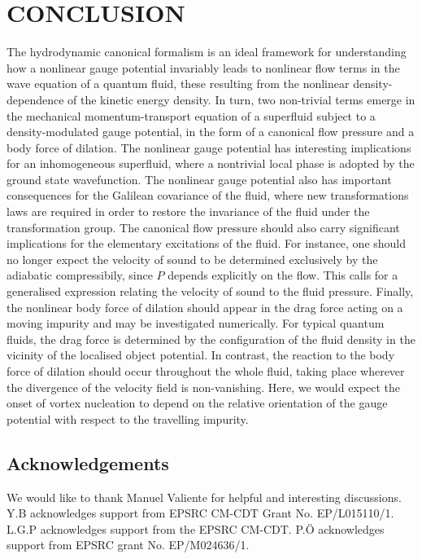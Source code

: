 \documentclass[twocolumn, nofootinbib, nobibnotes, amsmath,amssymb,aps, pra, floatfix]{revtex4-1}
\begin{document}
\section{\label{sec:conclusion}CONCLUSION}
The hydrodynamic canonical formalism is an ideal framework for understanding how a nonlinear gauge potential invariably leads to nonlinear flow terms in the wave equation of a quantum fluid, these resulting from the nonlinear density-dependence of the kinetic energy density.
In turn, two non-trivial terms emerge in the mechanical momentum-transport equation of a superfluid subject to a density-modulated gauge potential, in the form of a canonical flow pressure and a body force of dilation.
The nonlinear gauge potential has interesting implications for an inhomogeneous superfluid, where a nontrivial local phase is adopted by the ground state wavefunction.
The nonlinear gauge potential also has important consequences for the Galilean covariance of the fluid, where new transformations laws are required in order to restore the invariance of the fluid under the transformation group.
The canonical flow pressure should also carry significant implications for the elementary excitations of the fluid.
For instance, one should no longer expect the velocity of sound to be determined exclusively by the adiabatic compressibily, since $P$ depends explicitly on the flow.
This calls for a generalised expression relating the velocity of sound to the fluid pressure.
Finally, the nonlinear body force of dilation should appear in the drag force acting on a moving impurity and may be investigated numerically.
For typical quantum fluids, the drag force is determined by the configuration of the fluid density in the vicinity of the localised object potential.
In contrast, the reaction to the body force of dilation should occur throughout the whole fluid, taking place wherever the divergence of the velocity field is non-vanishing.
Here, we would expect the onset of vortex nucleation to depend on the relative orientation of the gauge potential with respect to the travelling impurity. 
\subsection*{Acknowledgements}

We would like to thank Manuel Valiente for helpful and interesting discussions.
Y.B acknowledges support from EPSRC CM-CDT Grant No. EP/L015110/1.
L.G.P acknowledges support from the EPSRC CM-CDT.
P.{\"O} acknowledges support from EPSRC grant No. EP/M024636/1.


%


\end{document}
